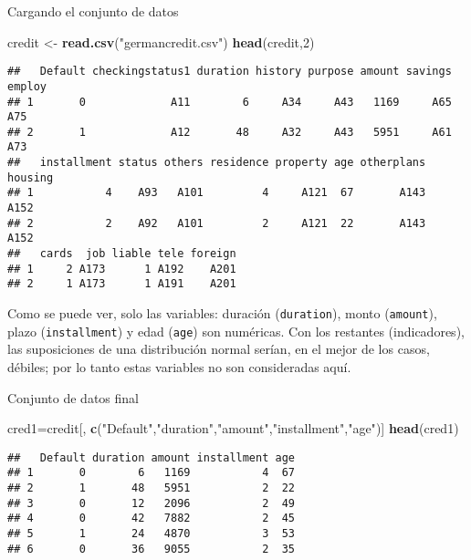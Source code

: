 \documentclass[ignorenonframetext,]{beamer}
\newenvironment{Shaded}{\begin{snugshade}}{\end{snugshade}}
\newcommand{\KeywordTok}[1]{\textcolor[rgb]{0.13,0.29,0.53}{\textbf{#1}}}
\newcommand{\DecValTok}[1]{\textcolor[rgb]{0.00,0.00,0.81}{#1}}
\newcommand{\StringTok}[1]{\textcolor[rgb]{0.31,0.60,0.02}{#1}}
\newcommand{\NormalTok}[1]{#1}
\begin{document}
\begin{frame}[fragile]{Cargando el conjunto de datos}

\begin{Shaded}
\begin{Highlighting}[]
\NormalTok{credit <-}\StringTok{ }\KeywordTok{read.csv}\NormalTok{(}\StringTok{"germancredit.csv"}\NormalTok{)}
\KeywordTok{head}\NormalTok{(credit,}\DecValTok{2}\NormalTok{)}
\end{Highlighting}
\end{Shaded}

\begin{verbatim}
##   Default checkingstatus1 duration history purpose amount savings employ
## 1       0             A11        6     A34     A43   1169     A65    A75
## 2       1             A12       48     A32     A43   5951     A61    A73
##   installment status others residence property age otherplans housing
## 1           4    A93   A101         4     A121  67       A143    A152
## 2           2    A92   A101         2     A121  22       A143    A152
##   cards  job liable tele foreign
## 1     2 A173      1 A192    A201
## 2     1 A173      1 A191    A201
\end{verbatim}

Como se puede ver, solo las variables: duración (\texttt{duration}),
monto (\texttt{amount}), plazo (\texttt{installment}) y edad
(\texttt{age}) son numéricas. Con los restantes (indicadores), las
suposiciones de una distribución normal serían, en el mejor de los
casos, débiles; por lo tanto estas variables no son consideradas aquí.

\end{frame}

\begin{frame}[fragile]{Conjunto de datos final}

\begin{Shaded}
\begin{Highlighting}[]
\NormalTok{cred1=credit[, }\KeywordTok{c}\NormalTok{(}\StringTok{"Default"}\NormalTok{,}\StringTok{"duration"}\NormalTok{,}\StringTok{"amount"}\NormalTok{,}\StringTok{"installment"}\NormalTok{,}\StringTok{"age"}\NormalTok{)]}
\KeywordTok{head}\NormalTok{(cred1)}
\end{Highlighting}
\end{Shaded}

\begin{verbatim}
##   Default duration amount installment age
## 1       0        6   1169           4  67
## 2       1       48   5951           2  22
## 3       0       12   2096           2  49
## 4       0       42   7882           2  45
## 5       1       24   4870           3  53
## 6       0       36   9055           2  35
\end{verbatim}

\end{frame}
\end{document}
